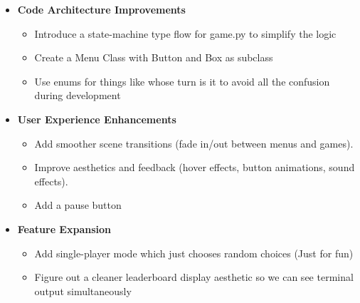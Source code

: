 \documentclass[12pt]{article}
\begin{document}
\begin{itemize}

\item \textbf{Code Architecture Improvements}
\begin{itemize}
\item Introduce a state-machine type flow for game.py to simplify the logic 
\item Create a Menu Class with Button and Box as subclass
\item Use enums for things like whose turn is it to avoid all the confusion during development
\end{itemize}

\item \textbf{User Experience Enhancements}
\begin{itemize}
\item Add smoother scene transitions (fade in/out between menus and games).
\item Improve aesthetics and feedback (hover effects, button animations, sound effects).
\item Add a pause button
\end{itemize}

\item \textbf{Feature Expansion}
\begin{itemize}
\item Add single-player mode which just chooses random choices (Just for fun)
\item Figure out a cleaner leaderboard display aesthetic so we can see terminal output simultaneously
\end{itemize}

\end{itemize}

\nocite{*}
\printbibliography
\end{document}
